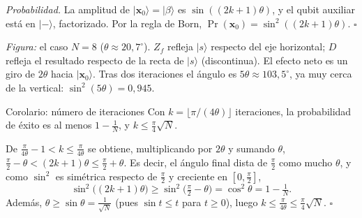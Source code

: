\documentclass[11pt, a4paper, twoside, openright]{report}
\providecommand{\ket}[1]{|#1\rangle}
\newcommand{\bx}{\mathbf{x}}
\begin{document}
\begin{demo}
\textit{Probabilidad.} La amplitud de $\ket{\bx_0} = \ket{\beta}$ es $\sin((2k+1)\theta)$, y el qubit auxiliar está en $\ket{-}$, factorizado. Por la regla de Born, $\Pr(\bx_0) = \sin^2((2k+1)\theta)$. \hfill$\square$
\end{demo}

\begin{center}
\end{center}
\noindent \textit{Figura:} el caso $N = 8$ ($\theta\approx20{,}7^\circ$). $Z_f$ refleja $\ket{s}$ respecto del eje horizontal; $D$ refleja el resultado respecto de la recta de $\ket{s}$ (discontinua). El efecto neto es un giro de $2\theta$ hacia $\ket{\bx_0}$. Tras dos iteraciones el ángulo es $5\theta\approx103{,}5^\circ$, ya muy cerca de la vertical: $\sin^2(5\theta) = 0{,}945$.

\begin{teoria}{Corolario: número de iteraciones}
Con $k = \lfloor\pi/(4\theta)\rfloor$ iteraciones, la probabilidad de éxito es al menos $1 - \frac1N$, y $k\le\frac{\pi}{4}\sqrt N$.
\end{teoria}

\begin{demo}
De $\frac{\pi}{4\theta} - 1 < k\le\frac{\pi}{4\theta}$ se obtiene, multiplicando por $2\theta$ y sumando $\theta$, $\frac{\pi}{2} - \theta < (2k+1)\theta\le\frac{\pi}{2} + \theta$. Es decir, el ángulo final dista de $\frac{\pi}{2}$ como mucho $\theta$, y como $\sin^2$ es simétrica respecto de $\frac{\pi}{2}$ y creciente en $[0,\frac{\pi}{2}]$,
\[ \sin^2\big((2k+1)\theta\big)\ge\sin^2\big(\tfrac{\pi}{2} - \theta\big) = \cos^2\theta = 1 - \tfrac1N. \]
Además, $\theta\ge\sin\theta = \frac{1}{\sqrt N}$ (pues $\sin t\le t$ para $t\ge0$), luego $k\le\frac{\pi}{4\theta}\le\frac{\pi}{4}\sqrt N$. \hfill$\square$
\end{demo}
\end{document}
